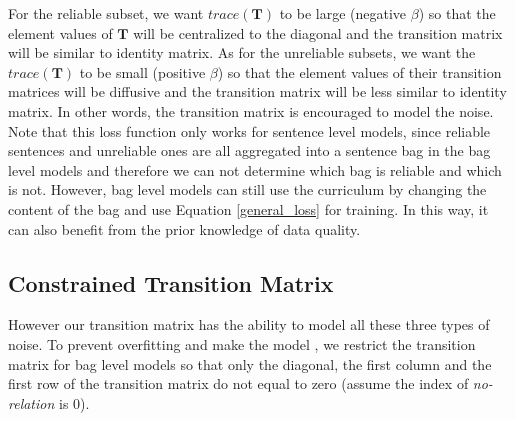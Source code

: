 For the reliable subset, we want $trace(\mathbf{T})$ to be large (negative $\beta$) so that the element values of $\mathbf{T}$ will be centralized to the diagonal and the transition matrix will be similar to identity matrix. As for the unreliable subsets, we want the $trace(\mathbf{T})$ to be small (positive $\beta$) so that the element values of their transition matrices will be diffusive and the transition matrix will be less similar to identity matrix. In other words, the transition matrix is encouraged to model the noise. Note that this loss function only works for sentence level models, since reliable sentences and unreliable ones are all aggregated into a sentence bag in the bag level models and therefore we can not determine which bag is reliable and which is not. However, bag level models can still use the curriculum by changing the content of the bag and use Equation \ref{general_loss} for training. In this way, it can also benefit from the prior knowledge of data quality.



\subsection{Constrained Transition Matrix}
 However our transition matrix has the ability to model all these three types of noise. To prevent overfitting and make the model , we restrict the transition matrix for bag level models so that only the diagonal, the first column and the first row of the transition matrix do not equal to zero (assume the index of \emph{no-relation} is 0).
